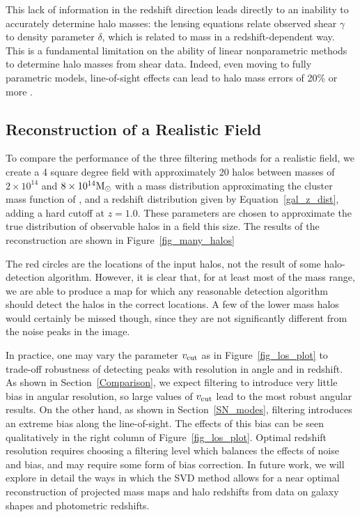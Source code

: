 This lack of information in the redshift direction leads directly 
to an inability to accurately determine halo masses:
the lensing equations relate observed shear $\gamma$ 
to density parameter $\delta$, which is related to mass in a
redshift-dependent way.  This is a fundamental limitation on the
ability of linear nonparametric methods to determine halo masses
from shear data. Indeed, even moving to fully parametric models, 
line-of-sight effects can lead to halo mass errors of 
20\% or more \citep{Hoekstra03, dePutter05}.

\subsection{Reconstruction of a Realistic Field}
\label{Realistic_Field}

To compare the performance of the three filtering methods 
for a realistic field, we
create a 4 square degree field with approximately 20 halos between masses of
$2\times 10^{14}$ and $8\times 10^{14} {\rm M_\odot}$ with a mass 
distribution approximating the cluster mass function of \citet{Rines07},
and a redshift distribution given by Equation~\ref{gal_z_dist},
adding a hard cutoff at $z=1.0$.  
These parameters are chosen to approximate the true 
distribution of observable halos in a field this size.
The results of the reconstruction are shown in 
Figure~\ref{fig_many_halos} 

The red circles are the locations of the input halos, not the result 
of some halo-detection algorithm.  However, it is clear that, 
for at least most of the mass range, we are able to produce a map 
for which any reasonable detection algorithm should detect the halos
in the correct locations.  A few of the lower mass halos would 
certainly be missed though, since they are not significantly 
different from the noise peaks in the image.

In practice, one may vary the parameter $v_{\rm cut}$ as in 
Figure~\ref{fig_los_plot}
to trade-off robustness of detecting peaks with resolution in angle and in 
redshift. As shown in Section~\ref{Comparison}, we expect
filtering to introduce very little bias in angular resolution, 
so large values of $v_{\rm cut}$ lead to the most robust angular results. 
On the other hand, as shown in Section~\ref{SN_modes},
filtering introduces an extreme bias along the line-of-sight.
The effects of this bias can be seen qualitatively
in the right column of Figure~\ref{fig_los_plot}.
Optimal redshift resolution requires choosing a 
filtering level which balances the effects of noise and bias,
and may require some form of bias correction.  In future work, we will
explore in detail the ways in which the SVD method allows
for a near optimal reconstruction of projected mass maps
and halo redshifts from data on galaxy shapes and photometric redshifts. 

